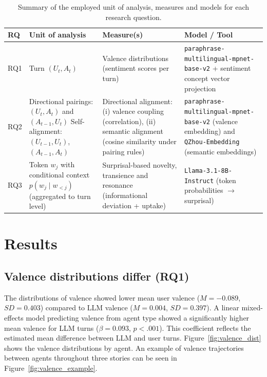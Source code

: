 \documentclass[11pt]{article}
\begin{document}
\begin{table}[t]
\centering
\small
\setlength{\tabcolsep}{5pt}
\renewcommand{\arraystretch}{1.2}
\begin{tabularx}{\textwidth}{l >{\RaggedRight\arraybackslash}p{} >{\RaggedRight\arraybackslash}X >{\RaggedRight\arraybackslash}X}
\toprule
\textbf{RQ} & \textbf{Unit of analysis} & \textbf{Measure(s)} & \textbf{Model / Tool} \\
\midrule
RQ1 & Turn $(U_t, A_t)$ &
Valence distributions (sentiment scores per turn) &
\texttt{paraphrase-multilingual-mpnet-base-v2}%
 + sentiment concept vector projection %
\\
\midrule
RQ2 &
Directional pairings: $(U_t, A_t)$ and $(A_{t-1}, U_t)$\newline
Self-alignment: $(U_{t-1}, U_t)$, $(A_{t-1}, A_t)$ &
Directional alignment: (i) valence coupling (correlation), (ii) semantic alignment (cosine similarity under pairing rules) &
\texttt{paraphrase-multilingual-mpnet-base-v2} (valence embedding) and \texttt{QZhou-Embedding} (semantic embeddings) \\
\midrule
RQ3 &
Token $w_j$ with conditional context $p(w_j \mid w_{<j})$ (aggregated to turn level) &
Surprisal-based novelty, transience and resonance (informational deviation + uptake) &
\texttt{Llama-3.1-8B-Instruct} (token probabilities $\rightarrow$ surprisal) \\
\bottomrule
\end{tabularx}
\caption{Summary of the employed unit of analysis, measures and models for each research question.}
\label{tab:rq_summary}
\end{table}


\section{Results}

\subsection{Valence distributions differ (RQ1)}
The distributions of valence showed lower mean user valence ($M=-0.089$, $SD=0.403$) compared to LLM valence ($M=0.004$, $SD=0.397$). A linear mixed-effects model predicting valence from agent type showed a significantly higher mean valence for LLM turns ($\beta = 0.093$, $p<.001$). This coefficient reflects the estimated mean difference between LLM and user turns. Figure~\ref{fig:valence_dist} shows the valence distributions by agent. An example of valence trajectories between agents throughout three stories can be seen in Figure~\ref{fig:valence_example}.
\end{document}
